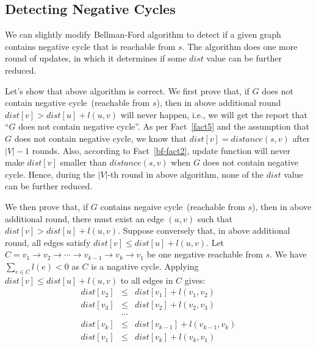 \subsection*{Detecting Negative Cycles}

We can slightly modify Bellman-Ford algorithm to detect if a given graph contains negative cycle that is reachable from $s$.
The algorithm does one more round of updates, in which it determines if some $dist$ value can be further reduced.

\begin{minipage}{0.8\textwidth}
	\xxx
	\xxx
	\xxx
	\xxx
	\xxx
	\xxx
	\xxx
	\xxx
	\xxx
	\xxx
	\xxx
	\xxx
	\xxx
\end{minipage}


Let's show that above algorithm is correct.
We first prove that, if $G$ does not contain negative cycle~(reachable from $s$), then in above additional round $dist[v] > dist[u] + l(u,v)$ will never happen,
i.e., we will get the report that ``$G$ does not contain negative cycle''.
As per Fact~\ref{fact5} and the assumption that $G$ does not contain negative cycle, we know that $dist[v] = distance(s,v)$ after $|V| -1 $ rounds.
Also, according to Fact~\ref{bf-fact2}, update function will never make $dist[v]$ smaller than $distance(s,v)$ when $G$ does not contain negative cycle.
Hence, during the $|V|$-th round in above algorithm, none of the $dist$ value can be further reduced.

We then prove that, if $G$ contains negaive cycle~(reachable from $s$), then in above additional round, there must exist an edge $(u,v)$ such that $dist[v] > dist[u] + l(u,v)$.
Suppose conversely that, in above additional round, all edges satisfy $dist[v] \le dist[u] + l(u,v)$.
Let $C = v_1 \to v_2 \to \cdots \to v_{k-1} \to v_k \to v_1$ be one negative reachable from $s$.  We have $\sum_{e\in C} l(e) < 0$ as $C$ is a nagative cycle.
Applying $dist[v] \le dist[u] + l(u,v)$ to all edges in $C$ gives:
\begin{displaymath}
\begin{array}{llllllllllllll}
	dist[v_2] & \le & dist[v_1] + l(v_1, v_2) \\
	dist[v_3] & \le & dist[v_2] + l(v_2, v_3) \\
	& \cdots & \\
	dist[v_k] & \le & dist[v_{k-1}] + l(v_{k-1}, v_k) \\
	dist[v_1] & \le & dist[v_{k}] + l(v_{k}, v_1)
\end{array}
\end{displaymath}

